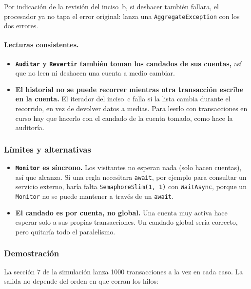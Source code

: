 Por indicación de la revisión del inciso~b, si deshacer también fallara, el procesador ya no
tapa el error original: lanza una \texttt{AggregateException} con los dos errores.

\paragraph{Lecturas consistentes.}
\begin{itemize}
  \item \textbf{\texttt{Auditar} y \texttt{Revertir} también toman los candados de sus
        cuentas,} así que no leen ni deshacen una cuenta a medio cambiar.
  \item \textbf{El historial no se puede recorrer mientras otra transacción escribe en la
        cuenta.} El iterador del inciso~c falla si la lista cambia durante el recorrido, en
        vez de devolver datos a medias. Para leerlo con transacciones en curso hay que hacerlo
        con el candado de la cuenta tomado, como hace la auditoría.
\end{itemize}

\subsubsection{Límites y alternativas}

\begin{itemize}
  \item \textbf{\texttt{Monitor} es síncrono.} Los visitantes no esperan nada (solo hacen
        cuentas), así que alcanza. Si una regla necesitara \texttt{await}, por ejemplo para
        consultar un servicio externo, haría falta \texttt{SemaphoreSlim(1, 1)} con
        \texttt{WaitAsync}, porque un \texttt{Monitor} no se puede mantener a través de un
        \texttt{await}.
  \item \textbf{El candado es por cuenta, no global.} Una cuenta muy activa hace esperar solo a
        sus propias transacciones. Un candado global sería correcto, pero quitaría todo el
        paralelismo.
\end{itemize}

\subsubsection{Demostración}

La sección 7 de la simulación lanza 1000 transacciones a la vez en cada caso. La salida no
depende del orden en que corran los hilos:


